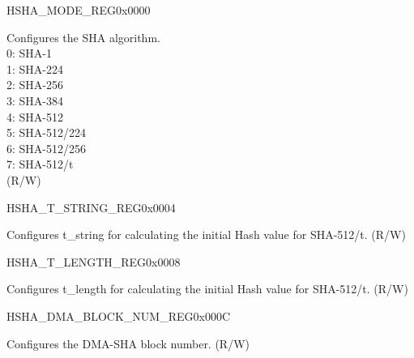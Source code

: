 \begin{register}{H}{SHA\_MODE\_REG}{0x0000}\label{regdesc:SHAMODEREG}
%
%
\regnewline%
\begin{regdesc}\begin{reglist}
\label{fielddesc:SHAMODE}\item [SHA\_MODE] Configures the SHA algorithm. \\
0: SHA-1\\
1: SHA-224\\
2: SHA-256\\
3: SHA-384\\
4: SHA-512\\
5: SHA-512/224\\
6: SHA-512/256\\
7: SHA-512/t\\
(R/W)
\end{reglist}\end{regdesc}
\end{register}


\begin{register}{H}{SHA\_T\_STRING\_REG}{0x0004}\label{regdesc:SHATSTRINGREG}
%
\regnewline%
\begin{regdesc}\begin{reglist}
\label{fielddesc:SHATSTRING}\item [SHA\_T\_STRING] Configures t\_string for calculating the initial Hash value for SHA-512/t. (R/W)
\end{reglist}\end{regdesc}
\end{register}


\begin{register}{H}{SHA\_T\_LENGTH\_REG}{0x0008}\label{regdesc:SHATLENGTHREG}
%
%
\regnewline%
\begin{regdesc}\begin{reglist}
\label{fielddesc:SHATLENGTH}\item [SHA\_T\_LENGTH] Configures t\_length for calculating the initial Hash value for SHA-512/t. (R/W)
\end{reglist}\end{regdesc}
\end{register}

\begin{register}{H}{SHA\_DMA\_BLOCK\_NUM\_REG}{0x000C}\label{regdesc:SHADMABLOCKNUMREG}
%
%
\regnewline%
\begin{regdesc}\begin{reglist}
\label{fielddesc:SHADMABLOCKNUM}\item [SHA\_DMA\_BLOCK\_NUM] Configures the DMA-SHA block number. (R/W)
\end{reglist}\end{regdesc}
\end{register}

